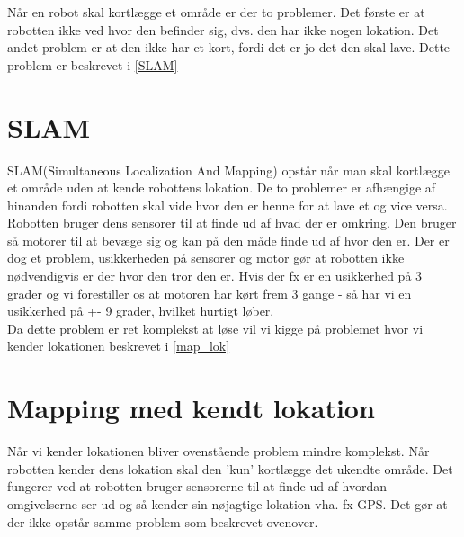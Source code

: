 Når en robot skal kortlægge et område er der to problemer. 
Det første er at robotten ikke ved hvor den befinder sig, dvs. den har ikke nogen lokation.
Det andet problem er at den ikke har et kort, fordi det er jo det den skal lave.
Dette problem er beskrevet i \cref{SLAM}

\section*{SLAM}\label{SLAM}
SLAM(Simultaneous Localization And Mapping) opstår når man skal kortlægge et område uden at kende robottens lokation.
De to problemer er afhængige af hinanden fordi robotten skal vide hvor den er henne for at lave et og vice versa.
Robotten bruger dens sensorer til at finde ud af hvad der er omkring.
Den bruger så motorer til at bevæge sig og kan på den måde finde ud af hvor den er.
Der er dog et problem, usikkerheden på sensorer og motor gør at robotten ikke nødvendigvis er der hvor den tror den er.
Hvis der fx er en usikkerhed på 3 grader og vi forestiller os at motoren har kørt frem 3 gange - så har vi en usikkerhed på +- 9 grader, hvilket hurtigt løber.
\\
Da dette problem er ret komplekst at løse vil vi kigge på problemet hvor vi kender lokationen beskrevet i \cref{map_lok}

\section*{Mapping med kendt lokation}\label{map_lok}
Når vi kender lokationen bliver ovenstående problem mindre komplekst.
Når robotten kender dens lokation skal den 'kun' kortlægge det ukendte område.
Det fungerer ved at robotten bruger sensorerne til at finde ud af hvordan omgivelserne ser ud og så kender sin nøjagtige lokation vha. fx GPS.
Det gør at der ikke opstår samme problem som beskrevet ovenover.